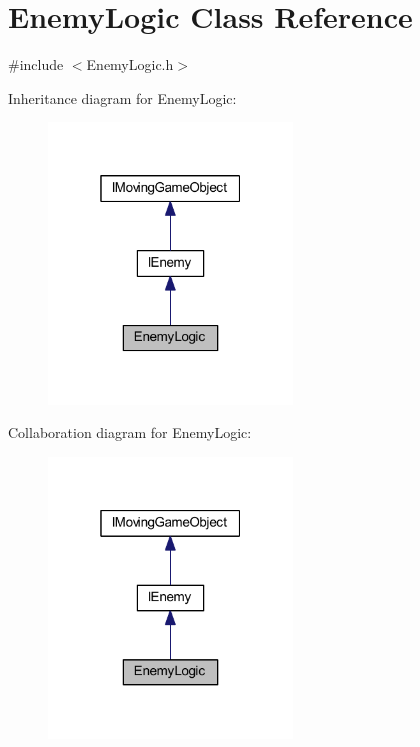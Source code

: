 \hypertarget{class_enemy_logic}{}\section{Enemy\+Logic Class Reference}
\label{class_enemy_logic}


{\ttfamily \#include $<$Enemy\+Logic.\+h$>$}



Inheritance diagram for Enemy\+Logic\+:\nopagebreak
\begin{figure}[H]
\begin{center}
\leavevmode
\includegraphics[width=184pt]{class_enemy_logic__inherit__graph}
\end{center}
\end{figure}


Collaboration diagram for Enemy\+Logic\+:\nopagebreak
\begin{figure}[H]
\begin{center}
\leavevmode
\includegraphics[width=184pt]{class_enemy_logic__coll__graph}
\end{center}
\end{figure}
